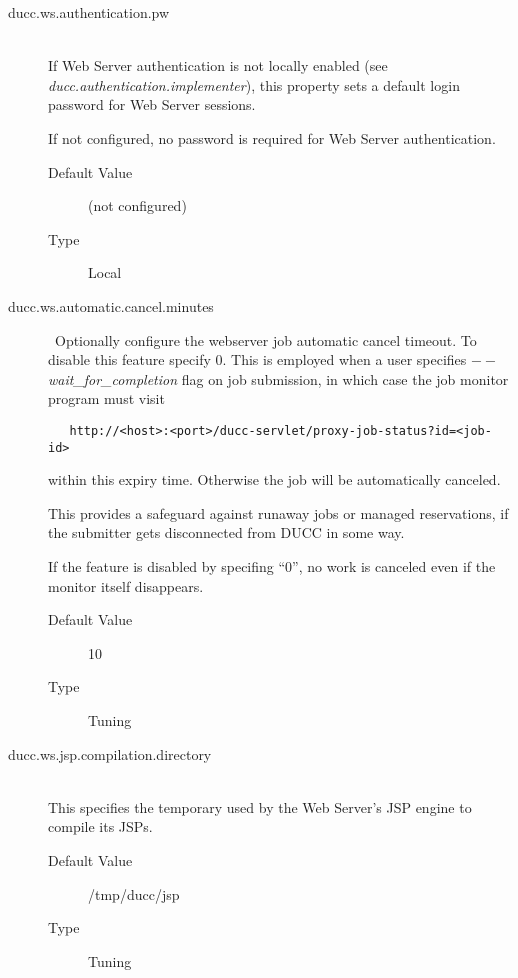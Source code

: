 \begin{description}
        \item[ducc.ws.authentication.pw] \hfill \\
          If Web Server authentication is not locally enabled (see {\em ducc.authentication.implementer}),
          this property sets a default login password for Web Server sessions.

          If not configured, no password is required for Web Server authentication.
          \begin{description}
            \item[Default Value] (not configured)
            \item[Type] Local
          \end{description}

        \item[ducc.ws.automatic.cancel.minutes] \hfill \ Optionally configure the webserver job
          automatic cancel timeout. To disable this feature specify 0.  This is employed when a user
          specifies {\em$--$wait\_for\_completion} flag on job submission, in which case the job
          monitor program must visit 
\begin{verbatim}
   http://<host>:<port>/ducc-servlet/proxy-job-status?id=<job-id>
\end{verbatim}
          within this expiry time.  Otherwise the job will be automatically canceled.

          This provides a safeguard against runaway jobs or managed reservations, if the
          submitter gets disconnected from DUCC in some way.

          If the feature is disabled by specifing ``0'', no work is canceled even if the
          monitor itself disappears.

          \begin{description}
            \item[Default Value] 10
            \item[Type] Tuning
          \end{description}

        \item[ducc.ws.jsp.compilation.directory] \hfill \\
          This specifies the temporary used by the Web Server's JSP engine to compile its JSPs.
          \begin{description}
            \item[Default Value] /tmp/ducc/jsp
            \item[Type] Tuning
          \end{description}

      \end{description}  
            

